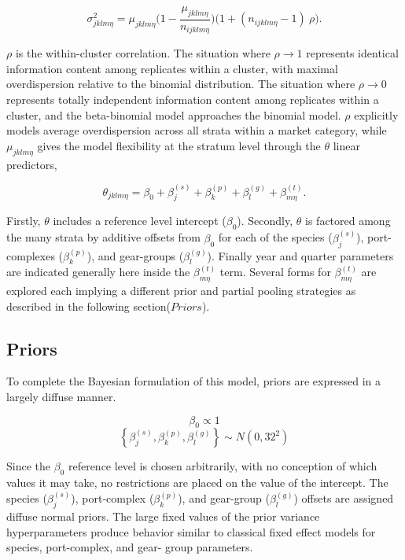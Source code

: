 \documentclass[12pt]{article}
\begin{document}
\[\sigma^2_{jklm\eta} = \mu_{jklm\eta}\Big(1-\frac{\mu_{jklm\eta}}{n_{ijklm\eta}}\Big)\Big(1+(n_{ijklm\eta}-1)~\rho\Big).\]

\(\rho\) is the within-cluster correlation. The situation where
\(\rho\rightarrow1\) represents identical information content among
replicates within a cluster, with maximal overdispersion relative to the
binomial distribution. The situation where \(\rho\rightarrow0\)
represents totally independent information content among replicates
within a cluster, and the beta-binomial model approaches the binomial
model. \(\rho\) explicitly models average overdispersion across all
strata within a market category, while \(\mu_{jklm\eta}\) gives the
model flexibility at the stratum level through the \(\theta\) linear
predictors,

\[\theta_{jklm\eta} = \beta_0 + \beta^{(s)}_j + \beta^{(p)}_k + \beta^{(g)}_l + \beta^{(t)}_{m\eta}.\]

Firstly, \(\theta\) includes a reference level intercept (\(\beta_0\)).
Secondly, \(\theta\) is factored among the many strata by additive
offsets from \(\beta_0\) for each of the species (\(\beta^{(s)}_j\)),
port-complexes (\(\beta^{(p)}_k\)), and gear-groups (\(\beta^{(g)}_l\)).
Finally year and quarter parameters are indicated generally here inside
the \(\beta^{(t)}_{m\eta}\) term. Several forms for
\(\beta^{(t)}_{m\eta}\) are explored each implying a different prior and
partial pooling strategies as described in the following
section(\(Priors\)).

\subsection{Priors}\label{priors}

To complete the Bayesian formulation of this model, priors are expressed
in a largely diffuse manner.

\[\beta_0 \propto 1\]
\[\left\{\beta^{(s)}_j, \beta^{(p)}_k, \beta^{(g)}_l\right\} \sim N(0, 32^2)\]

Since the \(\beta_0\) reference level is chosen arbitrarily, with no
conception of which values it may take, no restrictions are placed on
the value of the intercept. The species (\(\beta^{(s)}_j\)),
port-complex (\(\beta^{(p)}_k\)), and gear-group (\(\beta^{(g)}_l\))
offsets are assigned diffuse normal priors. The large fixed values of
the prior variance hyperparameters produce behavior similar to classical
fixed effect models for species, port-complex, and gear- group
parameters.
\end{document}
